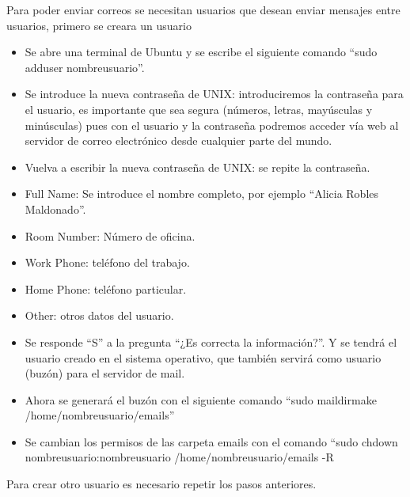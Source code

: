\documentclass[12pt,oneside,onecolumn,openany]{report}
\begin{document}
Para poder enviar correos se necesitan usuarios que desean enviar mensajes entre usuarios, primero se creara un usuario
\begin{itemize}
 \item Se abre una terminal de Ubuntu y se escribe el siguiente comando “sudo adduser nombreusuario”.
 \item Se introduce la nueva contraseña de UNIX: introduciremos la contraseña para el usuario, es importante que sea segura (números, letras, mayúsculas y minúsculas) pues con el usuario y la contraseña podremos acceder vía web al servidor de correo electrónico desde cualquier parte del mundo.
 \item Vuelva a escribir la nueva contraseña de UNIX: se repite la contraseña.
 \item Full Name: Se introduce el nombre completo, por ejemplo ``Alicia Robles Maldonado''.
 \item Room Number: Número de oficina.
 \item Work Phone: teléfono del trabajo.
 \item Home Phone: teléfono particular.
 \item Other: otros datos del usuario.
 \item Se responde ``S'' a la pregunta ``¿Es correcta la información?''. Y se tendrá el usuario creado en el sistema operativo, que también servirá como usuario (buzón) para el servidor de mail.
 \item Ahora se generará el buzón con el siguiente comando “sudo maildirmake /home/nombreusuario/emails”
 \item Se cambian los permisos de las carpeta emails con el comando “sudo chdown nombreusuario:nombreusuario /home/nombreusuario/emails -R
\end{itemize}
Para crear otro usuario es necesario repetir los pasos anteriores.
\end{document}
